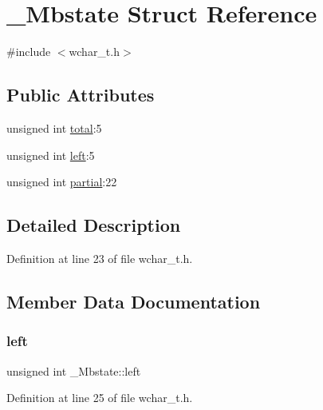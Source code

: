 \hypertarget{struct__Mbstate}{}\section{\+\_\+\+Mbstate Struct Reference}
\label{struct__Mbstate}


{\ttfamily \#include $<$wchar\+\_\+t.\+h$>$}

\subsection*{Public Attributes}
\begin{DoxyCompactItemize}
\item 
unsigned int \mbox{\hyperlink{struct__Mbstate_a15deae3c0de3461b42f32f9ab8a692aa}{total}}\+:5
\item 
unsigned int \mbox{\hyperlink{struct__Mbstate_a3a4a6dda3c132f5573306a678ba15d30}{left}}\+:5
\item 
unsigned int \mbox{\hyperlink{struct__Mbstate_a9e544514aea6bd4a6f8cf50819de298e}{partial}}\+:22
\end{DoxyCompactItemize}


\subsection{Detailed Description}


Definition at line 23 of file wchar\+\_\+t.\+h.



\subsection{Member Data Documentation}
\mbox{\label{struct__Mbstate_a3a4a6dda3c132f5573306a678ba15d30}} 
\subsubsection{\texorpdfstring{left}{left}}
{\footnotesize\ttfamily unsigned int \+\_\+\+Mbstate\+::left}



Definition at line 25 of file wchar\+\_\+t.\+h.

\mbox{\label{struct__Mbstate_a9e544514aea6bd4a6f8cf50819de298e}} 
